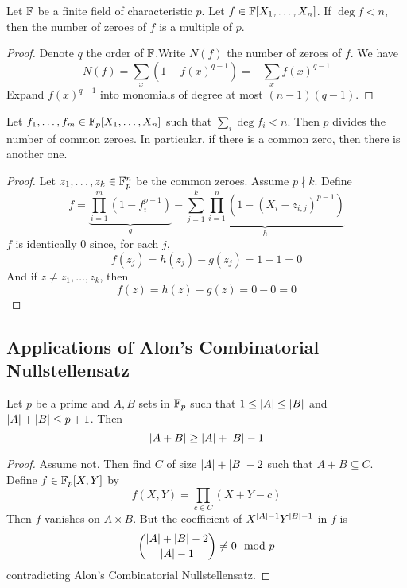 \documentclass{article}
\begin{document}
\begin{nthm}
  Let $\mathbb F$ be a finite field of characteristic $p$. Let $f \in \mathbb F[X_1, \dots, X_n]$. If $\deg f < n$, then the number of zeroes of $f$ is a multiple of $p$.
\end{nthm}
\begin{proof}
  Denote $q$ the order of $\mathbb F$.Write $N(f)$ the number of zeroes of $f$. We have
  $$N(f) = \sum_x(1 - f(x)^{q - 1}) = - \sum_x f(x)^{q - 1}$$
  Expand $f(x)^{q - 1}$ into monomials of degree at most $(n - 1)(q - 1)$.
\end{proof}

\newlec

\begin{nthm}
  Let $f_1, \dots, f_m \in \mathbb F_p[X_1, \dots, X_n]$ such that $\sum_i \deg f_i < n$. Then $p$ divides the number of common zeroes. In particular, if there is a common zero, then there is another one.
\end{nthm}
\begin{proof}
  Let $z_1, \dots, z_k \in \mathbb F_p^n$ be the common zeroes. Assume $p \nmid k$. Define
  $$f = \underbrace{\prod_{i = 1}^m (1 - f_i^{p - 1})}_g - \underbrace{\sum_{j = 1}^k \prod_{i = 1}^n (1 - (X_i - z_{i, j})^{p - 1})}_h$$
  $f$ is identically $0$ since, for each $j$,
  $$f(z_j) = h(z_j) - g(z_j) = 1 - 1 = 0$$
  And if $z \ne z_1, \dots, z_k$, then
  $$f(z) = h(z) - g(z) = 0 - 0 = 0$$
\end{proof}

\clearpage

\subsection{Applications of Alon's Combinatorial Nullstellensatz}

\begin{nthm}
  Let $p$ be a prime and $A, B$ sets in $\mathbb F_p$ such that $1 \le \left\lvert A\right\rvert \le \left\lvert B\right\rvert$ and $\left\lvert A\right\rvert + \left\lvert B\right\rvert \le p + 1$. Then
  $$\left\lvert A + B\right\rvert \ge \left\lvert A\right\rvert + \left\lvert B\right\rvert - 1$$
\end{nthm}
\begin{proof}
  Assume not. Then find $C$ of size $\left\lvert A\right\rvert + \left\lvert B\right\rvert - 2$ such that $A + B \subseteq C$. Define $f \in \mathbb F_p[X, Y]$ by
  $$f(X, Y) = \prod_{c \in C}(X + Y - c)$$
  Then $f$ vanishes on $A \times B$. But the coefficient of $X^{\left\lvert A\right\rvert - 1}Y^{\left\lvert B\right\rvert - 1}$ in $f$ is
  $$\binom{\left\lvert A\right\rvert + \left\lvert B\right\rvert - 2}{\left\lvert A\right\rvert - 1} \ne 0 \mod p$$
  contradicting Alon's Combinatorial Nullstellensatz.
\end{proof}
\end{document}
